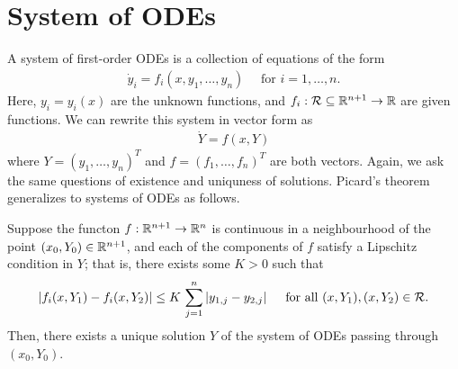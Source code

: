 \section{System of ODEs}

A system of first-order ODEs is a collection of equations of the form
\begin{align}
    \dot{y}_{i} = f_{i}(x,y_{1},\ldots,y_{n}) \quad \text{ for } i = 1, \ldots, n.
\end{align}
Here, $y_{i} = y_{i}(x)$ are the unknown functions, and $f_{i}:\mathcal{R} \subseteq \mathbb{R}^{n+1} \to \mathbb{R}$ are given functions. We can rewrite this system in vector form as
\begin{align}
    \dot{Y} = f(x,Y)
\end{align}
where $Y = (y_{1}, \ldots, y_{n})^{T}$ and $f = (f_{1}, \ldots, f_{n})^{T}$ are both vectors. Again, we ask the same questions of existence and uniquness of solutions. Picard's theorem generalizes to systems of ODEs as follows.

\begin{theorem}
    Suppose the functon $f:\mathbb{R}^{n+1} \to \mathbb{R}^{n}$ is continuous in a neighbourhood of the point $(x_{0},Y_{0}) \in \mathbb{R}^{n+1}$, and each of the components of $f$ satisfy a Lipschitz condition in $Y$; that is, there exists some $K > 0$ such that
    \begin{align}
        \left| f_{i}(x,Y_{1}) - f_{i}(x,Y_{2}) \right| \leq K \, \sum_{j=1}^{n} \left| y_{1,j} - y_{2,j} \right| \quad \text{ for all } (x,Y_{1}),(x,Y_{2}) \in \mathcal{R}.
    \end{align}
    Then, there exists a unique solution $Y$ of the system of ODEs passing through $(x_{0},Y_{0})$.
\end{theorem}

